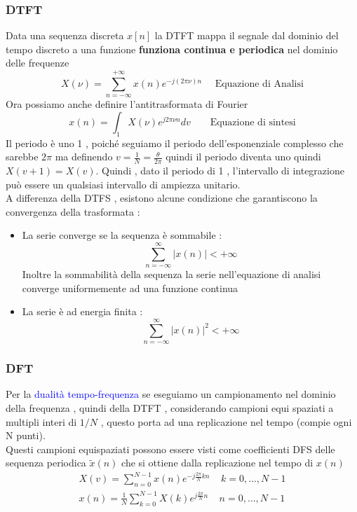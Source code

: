 \documentclass{article}
\theoremstyle{definition}
\newcommand{\suminf}{\sum_{n=-\infty}^{\infty}}
\begin{document}
	\subsubsection{DTFT}
	Data una sequenza discreta $x[n]$ la DTFT mappa il segnale dal dominio del tempo discreto a una funzione \textbf{funziona continua e periodica} nel dominio delle frequenze 
	$$X(\nu)=\sum_{n=-\infty}^{+\infty}x(n)e^{-j\left(2 \pi\nu\right) n } \ \ \ \ \ \ \text{Equazione di Analisi}$$
		Ora possiamo anche definire l'antitrasformata di Fourier
	$$x(n)=\int_1 X(\nu)e^{j2\pi \nu n }dv \ \ \ \ \ \ \ \ \ \text{Equazione di sintesi}$$
	Il periodo è uno 1 , poiché seguiamo il periodo dell'esponenziale complesso che sarebbe $2\pi$ ma definendo $v=\frac{1}{N}=\frac{\theta}{2\pi }$ quindi il periodo diventa uno quindi $X(v+1)=X(v)$. Quindi , dato il periodo di 1 , l'intervallo di integrazione può essere un qualsiasi intervallo di ampiezza unitario.\\   
	A differenza della DTFS , esistono alcune condizione che garantiscono la convergenza della trasformata : 
	\begin{itemize}
		\item La serie converge se la sequenza è sommabile : 
		$$\suminf |x(n)| < +\infty $$
		Inoltre la sommabilità della sequenza la serie nell'equazione di analisi converge uniformemente ad una funzione continua 
		\item La serie è ad energia finita : 
		$$\suminf |x(n)|^2 < +\infty $$
	\end{itemize}
	\subsubsection{DFT}
	Per la \textcolor{blue}{dualità tempo-frequenza} se eseguiamo un campionamento nel dominio della frequenza , quindi della DTFT , considerando campioni equi spaziati a multipli interi di $1/N$ , questo porta ad una replicazione nel tempo (compie ogni N punti).\\ Questi campioni equispaziati possono essere visti come coefficienti DFS delle sequenza  periodica $\tilde{x}(n)$ che si ottiene dalla replicazione nel tempo di $x(n)$ 
	\begin{align*}
		X(v)=\sum_{n=0}^{N-1}x(n)e^{-j \frac{2 
			\pi }{N}kn } \ \ \ \ \ k=0,\dots,N-1 \\ 
		x(n) = \frac{1}{N} \sum_{k=0}^{N-1}X(k) e^{j \frac{2 
				\pi }{N} n }  \ \ \ \ \ n =0,\dots,N-1
	\end{align*}
	
	
	
\end{document}
